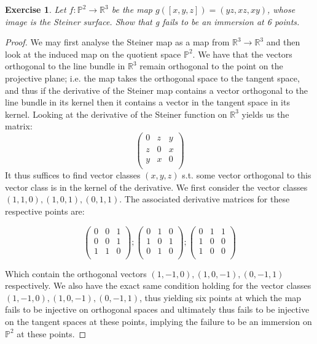 \documentclass{article}
\newtheorem{exercise}{Exercise}
\begin{document}
\begin{exercise}
  Let $f: \mathbb{P}^{2} \to \mathbb{R}^{3}$ be the map $g([x,y,z]) = (yz,xz,xy)$, whose image is the Steiner surface. Show that g fails to be an immersion at 6 points.
\end{exercise}

\begin{proof}
  We may first analyse the Steiner map as a map from $\mathbb{R}^{3} \to \mathbb{R}^{3}$ and then look at the induced map on the quotient space $\mathbb{P}^{2}$. We have that the vectors orthogonal to the line bundle in $\mathbb{R}^{3}$ remain orthogonal to the point on the projective plane; i.e. the map takes the orthogonal space to the tangent space, and thus if the derivative of the Steiner map contains a vector orthogonal to the line bundle in its kernel then it contains a vector in the tangent space in its kernel. Looking at the derivative of the Steiner function on $\mathbb{R}^{3}$ yields us the matrix:
  \[
    \begin{pmatrix}
      0 & z & y \\
      z & 0 & x \\
      y & x & 0 \\
    \end{pmatrix}
  \]
  It thus suffices to find vector classes $(x,y,z)$ s.t. some vector orthogonal to this vector class is in the kernel of the derivative. We first consider the vector classes $(1,1,0), (1,0,1), (0,1,1)$. The associated derivative matrices for these respective points are:

  \[
    \begin{pmatrix}
      0 & 0 & 1 \\
      0 & 0 & 1 \\
      1 & 1 & 0 \\
    \end{pmatrix} ;
    \begin{pmatrix}
      0 & 1 & 0 \\
      1 & 0 & 1 \\
      0 & 1 & 0 \\
    \end{pmatrix} ;
    \begin{pmatrix}
      0 & 1 & 1 \\
      1 & 0 & 0 \\
      1 & 0 & 0 \\
    \end{pmatrix}
  \]

  Which contain the orthogonal vectors $(1, -1, 0), (1, 0, -1), (0, -1, 1)$ respectively. We also have the exact same condition holding for the vector classes $(1, -1, 0), (1, 0 , -1), (0, -1, 1)$, thus yielding six points at which the map fails to be injective on orthogonal spaces and ultimately thus fails to be injective on the tangent spaces at these points, implying the failure to be an immersion on $\mathbb{P}^{2}$ at these points. 
\end{proof}
\end{document}
